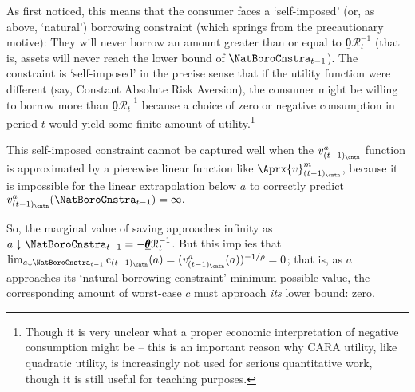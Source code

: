 \documentclass[titlepage, headings=optiontotocandhead]{Resources/texmf-local/tex/latex/econtex}
\begin{document}
As \cite{zeldesStochastic} first noticed, this means that the consumer faces a `self-imposed' (or, as above, `natural') borrowing constraint (which springs from the precautionary motive): They will never borrow an amount greater than or equal to $\underline{\pmb{\theta}}\mathcal{R}_{t}^{-1}$ (that is, assets will never reach the lower bound of $\NatBoroCnstra_{t-1}$).  The constraint is `self-imposed' in the precise sense that if the utility function were different (say, Constant Absolute Risk Aversion), the consumer might be willing to borrow more than $\underline{\pmb{\theta}}\mathcal{R}_{t}^{-1}$ because a choice of zero or negative consumption in period $t$ would yield some finite amount of utility.\footnote{Though it is very unclear what a proper economic interpretation of negative consumption might be -- this is an important reason why CARA utility, like quadratic utility, is increasingly not used for serious quantitative work, though it is still useful for teaching purposes.}

This self-imposed constraint cannot be captured well when the $v^{a}_{(t-1)_\cntn}$ function is approximated by a piecewise linear function like $\Aprx{v}^{m}_{(t-1)_\cntn}$, because it is impossible for the linear extrapolation below ${\underline{a}}$ to correctly predict $v^{a}_{(t-1)_\cntn}(\NatBoroCnstra_{t-1})=\infty.$ %


So, the marginal value of saving approaches infinity as $a \downarrow \NatBoroCnstra_{t-1}=-\underline{\pmb{\theta}}\mathcal{R}_{t}^{-1}$.  But this implies that $\lim_{a \downarrow \NatBoroCnstra_{t-1}} \mathrm{c}_{(t-1)_\cntn}(a) = (v^{a}_{(t-1)_\cntn}(a))^{-1/\rho} = 0$; that is, as $a$ approaches its `natural borrowing constraint' minimum possible value, the corresponding amount of worst-case $c$ must approach \textit{its} lower bound: zero.
\end{document}
